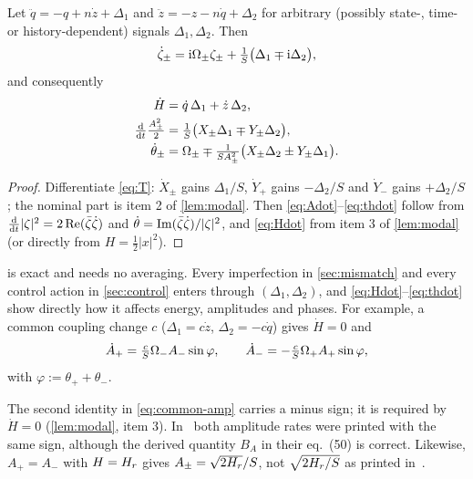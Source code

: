 \begin{lemma}\label{lem:perturbed}
Let $\ddot q=-q+n\dot z+\Delta_1$ and $\ddot z=-z-n\dot q+\Delta_2$ for arbitrary
(possibly state-, time- or history-dependent) signals $\Delta_1,\Delta_2$.
Then
\begin{equation}\label{eq:pert-modal}
  \dot\zeta_\pm=\mathrm{i}\Omega_\pm\zeta_\pm+\tfrac{1}{S}\big(\Delta_1\mp\mathrm{i}\Delta_2\big),
\end{equation}
and consequently
\begin{align}
  \dot H &= \dot q\,\Delta_1+\dot z\,\Delta_2, \label{eq:Hdot}\\
  \tfrac{\mathrm{d}}{\mathrm{d} t}\tfrac{A_\pm^2}{2} &= \tfrac1S\big(X_\pm\Delta_1\mp Y_\pm\Delta_2\big),
  \label{eq:Adot}\\
  \dot\theta_\pm &= \Omega_\pm\mp\tfrac{1}{SA_\pm^2}\big(X_\pm\Delta_2\pm Y_\pm\Delta_1\big).
  \label{eq:thdot}
\end{align}
\end{lemma}
\begin{proof}
Differentiate \eqref{eq:T}: $\dot X_\pm$ gains $\Delta_1/S$, $\dot Y_+$ gains
$-\Delta_2/S$ and $\dot Y_-$ gains $+\Delta_2/S$; the nominal part is item 2 of
\cref{lem:modal}.
Then \eqref{eq:Adot}--\eqref{eq:thdot} follow from
$\tfrac{\mathrm{d}}{\mathrm{d} t}|\zeta|^2=2\operatorname{Re}(\bar\zeta\dot\zeta)$ and
$\dot\theta=\operatorname{Im}(\bar\zeta\dot\zeta)/|\zeta|^2$, and \eqref{eq:Hdot} from
item 3 of \cref{lem:modal} (or directly from $H=\tfrac12|x|^2$).
\end{proof}

 is exact and needs no averaging.
Every imperfection in \cref{sec:mismatch} and every control action in
\cref{sec:control} enters through $(\Delta_1,\Delta_2)$, and
\eqref{eq:Hdot}--\eqref{eq:thdot} show directly how it affects energy, amplitudes
and phases.
For example, a common coupling change $c$ ($\Delta_1=c\dot z$,
$\Delta_2=-c\dot q$) gives $\dot H=0$ and
\begin{equation}\label{eq:common-amp}
  \dot A_+=\tfrac{c}{S}\Omega_- A_-\sin\varphi,\qquad
  \dot A_-=-\tfrac{c}{S}\Omega_+ A_+\sin\varphi,
\end{equation}
with $\varphi:=\theta_++\theta_-$.

\begin{remark}\label{rem:ecc-fix}
The second identity in \eqref{eq:common-amp} carries a minus sign; it is
required by $\dot H=0$ (\cref{lem:modal}, item 3).
In~\citet[eq.~(48)]{juchem2027restoring} both amplitude rates were printed with
the same sign, although the derived quantity $B_A$ in their eq.~(50) is correct.
Likewise, $A_+=A_-$ with $H=H_r$ gives $A_\pm=\sqrt{2H_r}/S$, not
$\sqrt{2H_r/S}$ as printed in~\citet[eq.~(52)]{juchem2027restoring}.
\end{remark}
